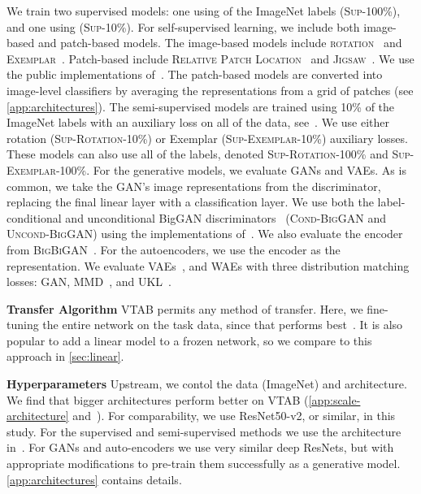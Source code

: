 \documentclass{article}
\newcommand{\myparagraph}[1]{\noindent\textbf{#1}\quad}
\newcommand{\imagenet}{ImageNet}
\begin{document}
We train two supervised models: one using  of the \imagenet{} labels (\textsc{Sup-100\%}), and one using  (\textsc{Sup-10\%}).
For self-supervised learning, we include both image-based and patch-based models.
The image-based models include \textsc{rotation}~\citep{gidaris2018unsupervised} and \textsc{Exemplar}~\citep{dosovitskiy2014exemplar}.
Patch-based include
\textsc{Relative Patch Location}~\citep{doersch2015unsupervised} and \textsc{Jigsaw}~\citep{noroozi2016unsupervised}.
We use the public implementations of~\citet{kolesnikov2019revisiting}.
The patch-based models are converted into image-level classifiers by averaging the representations from a  grid of patches (see \cref{app:architectures}).
The semi-supervised models are trained using 10\% of the \imagenet{} labels with an auxiliary loss on all of the data, see~\citep{zhai2019s4l}.
We use either rotation (\textsc{Sup-Rotation-10\%}) or Exemplar (\textsc{Sup-Exemplar-10\%}) auxiliary losses.
These models can also use all of the labels, denoted \textsc{Sup-Rotation-100\%} and \textsc{Sup-Exemplar-100\%}.
For the generative models, we evaluate GANs and VAEs.
As is common, we take the GAN's image representations from the discriminator, replacing the final linear layer with a classification layer.
We use both the label-conditional and unconditional BigGAN discriminators~\citep{brock2018large} (\textsc{Cond-BigGAN} and \textsc{Uncond-BigGAN}) using the implementations of~\citet{chen2019self,lucic2019high}.
We also evaluate the encoder from \textsc{BigBiGAN}~\citep{donahue2019large}.
For the autoencoders, we use the encoder as the representation.
We evaluate VAEs~\citep{kingma2013auto}, and WAEs with three distribution matching losses: GAN, MMD~\citep{tolstikhin2017wasserstein}, and UKL~\citep{rubenstein2019practical}.

\myparagraph{Transfer Algorithm}
VTAB permits any method of transfer.
Here, we fine-tuning the entire network on the task data, since that performs best~\citep{kornblith2018better}.
It is also popular to add a linear model to a frozen network, so we compare to this approach in \cref{sec:linear}.

\myparagraph{Hyperparameters}
Upstream, we contol the data (\imagenet{}) and architecture.
We find that bigger architectures perform better on VTAB (\cref{app:scale-architecture} and~\citet{kolesnikov2019revisiting}).
For comparability, we use ResNet50-v2, or similar, in this study.
For the supervised and semi-supervised methods we use the architecture in~\citet{he2016identity}.
For GANs and auto-encoders we use very similar deep ResNets, but with appropriate modifications to pre-train them successfully as a generative model.
\cref{app:architectures} contains details.
\end{document}
